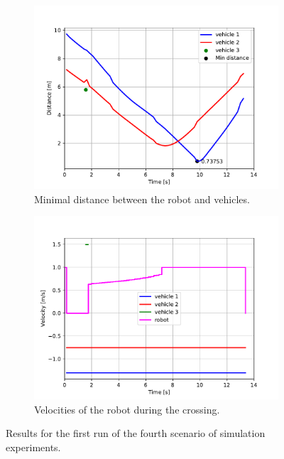             \begin{figure}[H]
                \centering
                \begin{subfigure}{0.49\linewidth}
                    \centering
                    \includegraphics[trim={13 8 40 41}, clip, width=\linewidth]{images/simulations/scene4_1_dist.pdf}
                    \caption{Minimal distance between the robot and vehicles.}
                \end{subfigure}
                \begin{subfigure}{0.49\linewidth}
                    \centering
                    \includegraphics[trim={13 8 40 41}, clip, width=\linewidth]{images/simulations/scene4_1_vel.pdf}
                    \caption{Velocities of the robot during the crossing.}
                \end{subfigure}
                \caption{Results for the first run of the fourth scenario of simulation experiments.}
                \label{fig:scene4_1_graphs}
            \end{figure}
